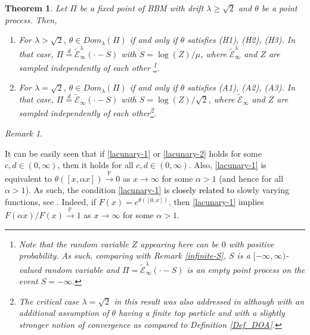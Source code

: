 \documentclass[a4paper,reqno]{amsart}%
\newcommand{\1}{\mathbf 1}
\theoremstyle{mine}
\newtheorem{theorem}{Theorem}
\numberwithin{theorem}{section}
\numberwithin{equation}{section}
\theoremstyle{remark}
\newtheorem{remark}{Remark}
\begin{document}
\begin{theorem} \label{main-thm-2}
    Let $\Pi$ be a fixed point of BBM with drift $\lambda \geq \sqrt{2}$ and $\theta$ be a point process. Then,   
\begin{enumerate}
    \item For $\lambda > \sqrt{2}$, $\theta \in Dom_{\lambda}(\Pi)$ if and only if $\theta$ satisfies (H1), (H2), (H3). In that case, $\Pi \overset{d}{=}\widetilde{\mathcal E}_\infty^\lambda(\cdot - S)$ with $S = \log(Z)/\mu$, where $\widetilde{\mathcal E}_\infty^\lambda$ and $Z$ are sampled independently of each other \footnote{Note that the random variable $Z$ appearing here can be $0$ with positive probability. As such, comparing with Remark \ref{infinite-S}, $S$ is a $[-\infty, \infty)$-valued random variable and $\Pi = \widetilde{\mathcal E}_\infty^\lambda(\cdot - S)$ is an empty point process on the event $S= -\infty$.}. \\

\item For $\lambda = \sqrt{2}$, $\theta \in Dom_{\lambda}(\Pi)$ if and only if $\theta$ satisfies (A1), (A2), (A3). In that case, $\Pi \overset{d}{=}\widetilde{\mathcal E}_\infty(\cdot - S)$ with $S = \log(Z)/\sqrt{2}$, where $\widetilde{\mathcal E}_\infty$ and $Z$ are sampled independently of each other\footnote{The critical case $\lambda = \sqrt{2}$ in this result was also addressed in \cite{Shekhar_Domain} although with an additional assumption of $\theta$ having a finite top particle and with a slightly stronger notion of convergence as compared to Definition \ref{Def_DOA}.}. 
\end{enumerate}

\end{theorem}


\begin{remark}\label{about-lacunary}

It can be easily seen that if \eqref{lacunary-1} or \eqref{lacunary-2} holds for some $c,d \in (0,\infty)$, then it holds for all $c,d \in (0,\infty)$. Also, \eqref{lacunary-1} is equivalent to $\theta([x, \alpha x]) \overset{\mathbb{P}}{\to} 0$ as $x\to \infty$ for some $\alpha>1$ (and hence for all $\alpha >1$). As such, the condition \eqref{lacunary-1} \textcolor{black}{is closely related to} slowly varying functions, see \cite{Bingham_Regular_variation}. Indeed, if $F(x) = e^{\theta([0,x])}$, then \eqref{lacunary-1} implies $F(\alpha x )/F(x) \overset{\mathbb{P}}{\rightarrow} 1$ as $x\to \infty$ for some $\alpha >1$.
\end{remark}
\end{document}
